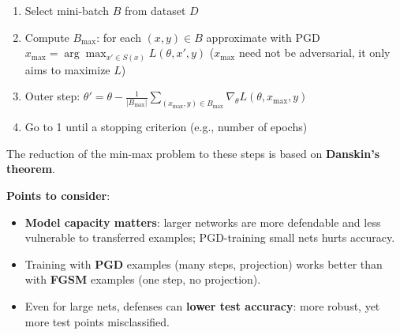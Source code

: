 \begin{enumerate}
  \item Select mini-batch $B$ from dataset $D$
  \item Compute $B_\text{max}$: for each $(x,y) \in B$ approximate with PGD
    $x_\text{max} = \arg\max_{x' \in S(x)} L(\theta, x', y)$
    ($x_\text{max}$ need not be adversarial, it only aims to maximize $L$)
  \item Outer step:
    $\theta' = \theta - \frac{1}{|B_\text{max}|}\sum_{(x_\text{max},y) \in B_\text{max}} \nabla_\theta L(\theta, x_\text{max}, y)$
  \item Go to 1 until a stopping criterion (e.g., number of epochs)
\end{enumerate}
The reduction of the min-max problem to these steps is based on \textbf{Danskin's theorem}.

\par\vspace{0pt plus 4\baselineskip}\vspace{0pt plus -4\baselineskip}%
\textbf{Points to consider}:
\begin{itemize}
  \item \textbf{Model capacity matters}: larger networks are more defendable and less vulnerable to transferred
    examples; PGD-training small nets hurts accuracy.
  \item Training with \textbf{PGD} examples (many steps, projection) works better than with \textbf{FGSM}
    examples (one step, no projection).
  \item Even for large nets, defenses can \textbf{lower test accuracy}: more robust, yet more test points misclassified.
\end{itemize}
